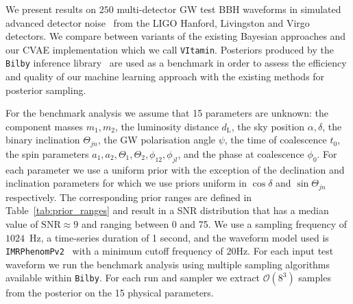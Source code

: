 \documentclass[%
showpacs,
nofootinbib,
 amsmath,amssymb,
 aps,
 twocolumn,
 prl,
 reprint,
floatfix,
]{revtex4-1}
\begin{document}
%
%

%
%
%
%
We present results on $250$ multi-detector \ac{GW} test \ac{BBH}
waveforms in simulated advanced detector noise~\cite{aligo_noisecurves}
from the LIGO Hanford, Livingston and Virgo detectors. We compare between
variants of the existing Bayesian approaches and our \ac{CVAE} implementation
which we call \texttt{VItamin}. Posteriors produced by the \texttt{Bilby}
inference library~\cite{1811.02042} are used as a benchmark in order to assess
the efficiency and quality of our machine learning approach with the existing
methods for posterior sampling.

%
%
For the benchmark analysis we assume that 15 parameters are
unknown: the component masses
$m_1,m_2$, the luminosity distance $d_{\text{L}}$, the sky position
$\alpha,\delta$, the binary inclination $\Theta_{jn}$, the \ac{GW} polarisation
angle ${\psi}$, the time of coalescence $t_{0}$, the spin parameters $a_1,a_2,
\Theta_1,\Theta_2,\phi_{12},\phi_{jl}$, and the phase at coalescence
$\phi_0$. For each parameter we use a uniform prior with the exception of
the declination and inclination parameters for which we use priors uniform in
$\cos\delta$ and $\sin\Theta_{jn}$ respectively. The corresponding prior ranges
are defined in Table~\ref{tab:prior_ranges} and result in a  \ac{SNR}
distribution that has a median value of $\text{SNR}\approx 9$ and ranging between 0 and 75.
We use a sampling frequency of $1024$~Hz, a time-series duration of 1 second, and
the waveform model used is \texttt{IMRPhenomPv2}~\cite{1809.10113} with a
minimum cutoff frequency of $20$Hz. For each input test waveform we run the
benchmark analysis using multiple sampling algorithms available within
\texttt{Bilby}. For each run and sampler we extract $\mathcal{O}(8^3)$
samples from the posterior on the 15 physical parameters.  
\end{document}
